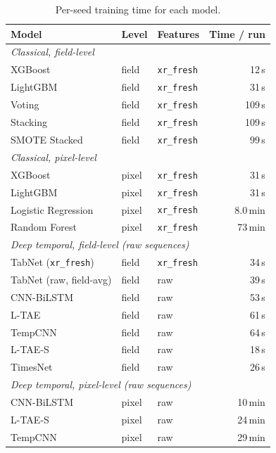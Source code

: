 \documentclass[preprint,authoryear,3p]{elsarticle}
\begin{document}
\begin{table}[!t]
\centering
\scriptsize
\caption{Per-seed training time for each model.}
\label{stab:cost}
\renewcommand{\arraystretch}{1.12}
\setlength{\tabcolsep}{6pt}
\begin{tabular}{lllr}
\toprule
\textbf{Model} & \textbf{Level} & \textbf{Features} & \textbf{Time / run} \\
\midrule
\multicolumn{4}{l}{\emph{Classical, field-level}}\\
XGBoost                & field & \texttt{xr\_fresh} & 12\,s \\
LightGBM               & field & \texttt{xr\_fresh} & 31\,s \\
Voting                 & field & \texttt{xr\_fresh} & 109\,s \\
Stacking               & field & \texttt{xr\_fresh} & 109\,s \\
SMOTE Stacked          & field & \texttt{xr\_fresh} & 99\,s \\
\midrule
\multicolumn{4}{l}{\emph{Classical, pixel-level}}\\
XGBoost                & pixel & \texttt{xr\_fresh} & 31\,s \\
LightGBM               & pixel & \texttt{xr\_fresh} & 31\,s \\
Logistic Regression    & pixel & \texttt{xr\_fresh} & 8.0\,min \\
Random Forest          & pixel & \texttt{xr\_fresh} & 73\,min \\
\midrule
\multicolumn{4}{l}{\emph{Deep temporal, field-level (raw sequences)}}\\
TabNet (\texttt{xr\_fresh}) & field & \texttt{xr\_fresh} & 34\,s \\
TabNet (raw, field-avg) & field & raw & 39\,s \\
CNN-BiLSTM             & field & raw & 53\,s \\
L-TAE                  & field & raw & 61\,s \\
TempCNN                & field & raw & 64\,s \\
L-TAE-S                & field & raw & 18\,s \\
TimesNet               & field & raw & 26\,s \\
\midrule
\multicolumn{4}{l}{\emph{Deep temporal, pixel-level (raw sequences)}}\\
CNN-BiLSTM             & pixel & raw & 10\,min \\
L-TAE-S                & pixel & raw & 24\,min \\
TempCNN                & pixel & raw & 29\,min \\

\end{tabular}
\end{table}
\end{document}

